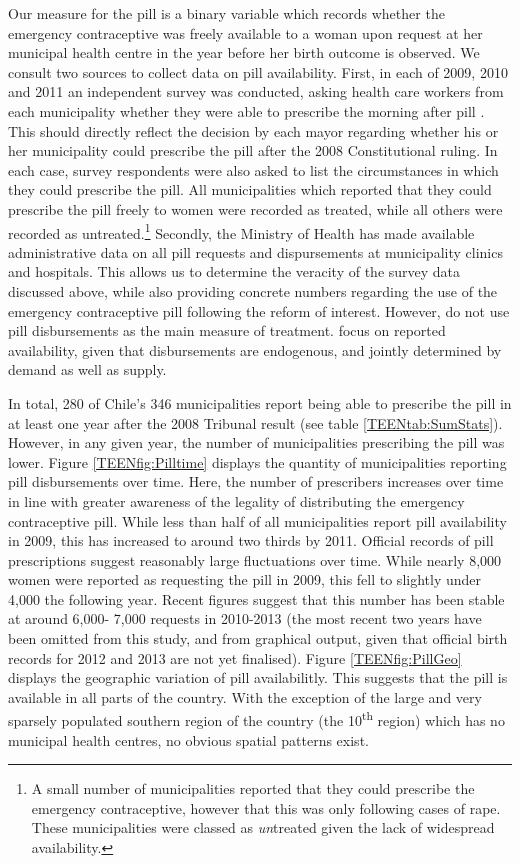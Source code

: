 Our measure for the pill is a binary variable which records whether the 
emergency contraceptive was freely available to a woman upon request at her 
municipal health centre in the year before her birth outcome is observed.  We
consult two sources to collect data on pill availability.  First, in each of 
2009, 2010 and 2011 an independent survey was conducted, asking health care 
workers from each municipality whether they were able to prescribe the morning
after pill \citep{Didesetal2009,Didesetal2010,Didesetal2011}. This should 
directly reflect the decision by each mayor regarding whether his or her
municipality could prescribe the pill after the 2008 Constitutional ruling.  
In each case, survey respondents were also asked to list the circumstances in 
which they could prescribe the pill.  All municipalities which reported that
they could prescribe the pill freely to women were recorded as treated, while 
all others were recorded as untreated.\footnote{A small number of 
municipalities reported that they could prescribe the emergency contraceptive, 
however that this was only following cases of rape.  These municipalities were 
classed as \emph{un}treated given the lack of widespread availability.}  
Secondly, the Ministry of Health has made available administrative data on 
all pill requests and dispursements at municipality clinics and hospitals.  This
allows us to determine the veracity of the survey data discussed above, 
while also providing concrete numbers regarding the use of the emergency 
contraceptive pill following the reform of interest.  However, \person do not
use pill disbursements as the main measure of treatment.  \Person focus on
reported availability, given that disbursements are endogenous, and jointly
determined by demand as well as supply.

In total, 280 of Chile's 346 municipalities report being able to prescribe the 
pill in at least one year after the 2008 Tribunal result (see table 
\ref{TEENtab:SumStats}). However, in any given year, the number of municipalities
prescribing the pill was lower. Figure \ref{TEENfig:Pilltime} displays the quantity
of municipalities reporting pill disbursements over time.  Here, the number
of prescribers increases over time in line with greater awareness of the legality 
of distributing the emergency contraceptive pill.  While less than half of all
municipalities report pill availability in 2009, this has increased to around
two thirds by 2011.  Official records of pill prescriptions suggest reasonably
large fluctuations over time.  While nearly 8,000 women were reported as 
requesting the pill in 2009, this fell to slightly under 4,000 the following
year.  Recent figures suggest that this number has been stable at around 6,000-%
7,000 requests in 2010-2013 (the most recent two years have been omitted from
this study, and from graphical output, given that official birth records for
2012 and 2013 are not yet finalised).  Figure \ref{TEENfig:PillGeo} displays
the geographic variation of pill availabilitly.  This suggests that the pill
is available in all parts of the country. With the exception of the large and 
very sparsely populated southern region of the country (the 
10\textsuperscript{th} region) which has no municipal health centres, no 
obvious spatial patterns exist.

